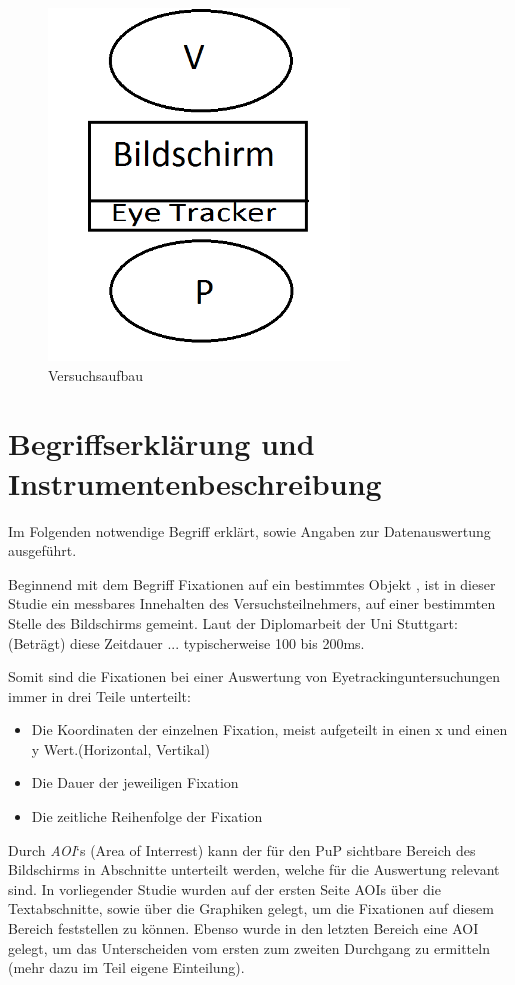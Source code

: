 \begin{figure}[H]
\noindent\hspace{0.5mm}\includegraphics[width=8cm]{./Ressourcen/Versuchsaufbau.png}
\caption{Versuchsaufbau}
\end{figure}

\section{Begriffserklärung und Instrumentenbeschreibung}
Im Folgenden notwendige Begriff erklärt, sowie Angaben zur Datenauswertung ausgeführt.


Beginnend mit dem Begriff \grqq Fixationen auf ein bestimmtes Objekt \grqq, ist in dieser Studie ein messbares Innehalten des Versuchsteilnehmers, auf einer bestimmten Stelle des Bildschirms gemeint. Laut der Diplomarbeit  der Uni Stuttgart: \grqq (Beträgt) diese Zeitdauer ... typischerweise 100 bis 200ms.\grqq

Somit sind die Fixationen bei einer Auswertung von Eyetrackinguntersuchungen immer in drei Teile unterteilt:
    \begin{itemize}
        \item Die Koordinaten der einzelnen Fixation, meist aufgeteilt in einen x und einen y Wert.(Horizontal, Vertikal)
        \item Die Dauer der jeweiligen Fixation
        \item Die zeitliche Reihenfolge der Fixation
    \end{itemize}


Durch \textit{AOI}`s (\grqq Area of Interrest\grqq) kann der für den \gls{PuP} sichtbare Bereich des Bildschirms in Abschnitte unterteilt werden, welche für die Auswertung relevant sind. In vorliegender Studie wurden auf der ersten Seite AOIs über die Textabschnitte, sowie über die Graphiken gelegt, um die Fixationen auf diesem Bereich feststellen zu können. Ebenso wurde in den letzten Bereich eine AOI gelegt, um das Unterscheiden vom ersten zum zweiten Durchgang zu ermitteln (mehr dazu im Teil eigene Einteilung).

